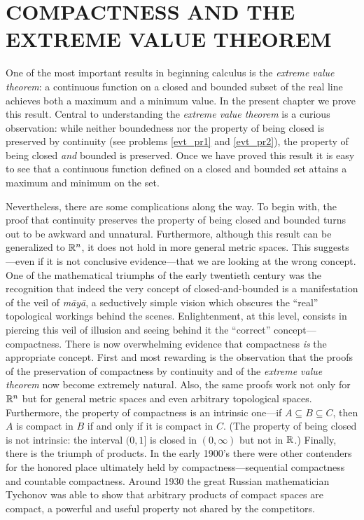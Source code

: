 \chapter{COMPACTNESS AND THE EXTREME VALUE THEOREM}\label{evt}

One of the most important results in beginning calculus is the \emph{extreme value theorem}: a
continuous function on a closed and bounded subset of the real line achieves both a maximum
and a minimum value. In the present chapter we prove this result. Central to understanding the
\emph{extreme value theorem} is a curious observation: while neither boundedness nor the
property of being closed is preserved by continuity (see problems \ref{evt_pr1} and
\ref{evt_pr2}), the property of being closed \emph{and} bounded is preserved.  Once we have
proved this result it is easy to see that a continuous function defined on a closed and
bounded set attains a maximum and minimum on the set.

Nevertheless, there are some complications along the way.  To begin with, the proof that
continuity preserves the property of being closed and bounded turns out to be awkward and
unnatural.
Furthermore, although this result can be generalized to $\mathbb{R}^n$, it does not hold in more
general metric spaces.  This suggests---even if it is not conclusive evidence---that we are
looking at the wrong concept.  One of the mathematical triumphs of the early twentieth century
was the recognition that indeed the very concept of closed-and-bounded is a manifestation of
the veil of \emph{m\={a}y\={a}}, a seductively simple vision which obscures the ``real''
topological workings behind the scenes.  Enlightenment, at this level, consists in piercing
this veil of illusion and seeing behind it the ``correct'' concept---compactness.  There is
now overwhelming evidence that compactness \emph{is} the appropriate concept.  First and most
rewarding is the observation that the proofs of the preservation of compactness by continuity
and of the \emph{extreme value theorem} now become extremely natural.  Also, the same proofs
work not only for $\mathbb{R}^n$ but for general metric spaces and even arbitrary topological spaces.
Furthermore, the property of compactness is an intrinsic one---if $A \subseteq B \subseteq C$,
then $A$ is compact in $B$ if and only if it is compact in $C$.  (The property of being closed
is not intrinsic: the interval $(0,1]$ is closed in $(0,\infty)$ but not in $\mathbb{R}$.) Finally,
there is the triumph of products.  In the early 1900's there were other contenders for the
honored place ultimately held by compactness---sequential compactness and countable
compactness. Around 1930 the great Russian mathematician Tychonov was able to show that
arbitrary products of compact spaces are compact, a powerful and useful property not shared by
the competitors.

